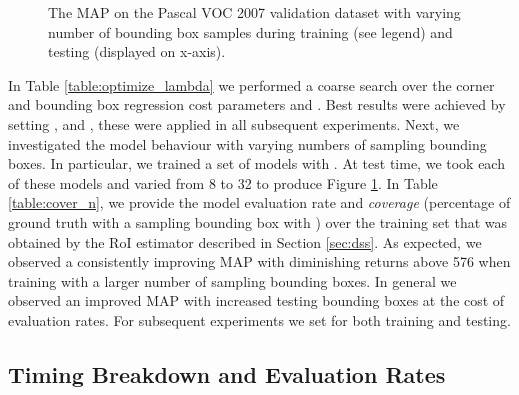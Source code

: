 \documentclass[10pt,twocolumn]{article}
\begin{document}
\begin{figure}[tb] 
\caption{The MAP on the Pascal VOC 2007 validation dataset with varying number of bounding box samples during training (see legend) and testing (displayed on x-axis).}
\label{fig:scale_n}
\end{figure}
In Table \ref{table:optimize_lambda} we performed a coarse search over the corner and bounding box regression cost parameters  and . Best results were achieved by setting ,  and , these were applied in all subsequent experiments. Next, we investigated the model behaviour with varying numbers of sampling bounding boxes. In particular, we trained a set of models with .  At test time, we took each of these models and varied  from 8 to 32 to produce Figure \ref{fig:scale_n}. In Table \ref{table:cover_n}, we provide the model evaluation rate and \textit{coverage} (percentage of ground truth with a sampling bounding box with ) over the training set that was obtained by the RoI estimator described in Section \ref{sec:dss}. As expected, we observed a consistently improving MAP with diminishing returns above 576 when training with a larger number of sampling bounding boxes. In general we observed an improved MAP with increased testing bounding boxes at the cost of evaluation rates. For subsequent experiments we set  for both training and testing.   


\subsection{Timing Breakdown and Evaluation Rates} \label{sec:timing_breakdown}
\end{document}
